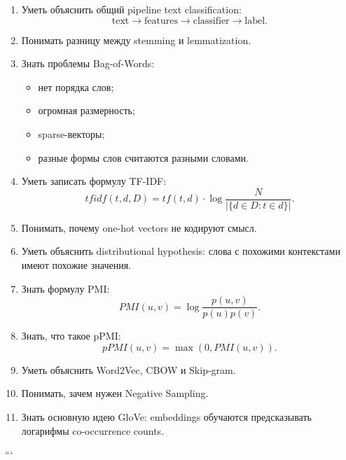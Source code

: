 \documentclass[a4paper,12pt]{article}
\begin{document}
\begin{enumerate}
    \item Уметь объяснить общий pipeline text classification:
    \[
    \text{text} \rightarrow \text{features} \rightarrow \text{classifier} \rightarrow \text{label}.
    \]

    \item Понимать разницу между stemming и lemmatization.

    \item Знать проблемы Bag-of-Words:
    \begin{itemize}
        \item нет порядка слов;
        \item огромная размерность;
        \item sparse-векторы;
        \item разные формы слов считаются разными словами.
    \end{itemize}

    \item Уметь записать формулу TF-IDF:
    \[
    tfidf(t,d,D)
    =
    tf(t,d)
    \cdot
    \log
    \frac{N}
    {|\{d \in D : t \in d\}|}.
    \]

    \item Понимать, почему one-hot vectors не кодируют смысл.

    \item Уметь объяснить distributional hypothesis:
    слова с похожими контекстами имеют похожие значения.

    \item Знать формулу PMI:
    \[
    PMI(u,v)
    =
    \log
    \frac{p(u,v)}{p(u)p(v)}.
    \]

    \item Знать, что такое pPMI:
    \[
    pPMI(u,v) = \max(0, PMI(u,v)).
    \]

    \item Уметь объяснить Word2Vec, CBOW и Skip-gram.

    \item Понимать, зачем нужен Negative Sampling.

    \item Знать основную идею GloVe:
    embeddings обучаются предсказывать логарифмы co-occurrence counts.
\end{enumerate}
```
\end{document}
